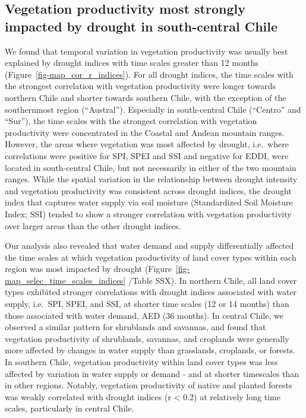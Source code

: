 \documentclass[
  sn-nature,
  numbered]{sn-jnl}
\begin{document}
\subsection{Vegetation productivity most strongly impacted by drought in
south-central
Chile}\label{vegetation-productivity-most-strongly-impacted-by-drought-in-south-central-chile}

We found that temporal variation in vegetation productivity was usually
best explained by drought indices with time scales greater than 12
months (Figure~\ref{fig-map_cor_r_indices}). For all drought indices,
the time scales with the strongest correlation with vegetation
productivity were longer towards northern Chile and shorter towards
southern Chile, with the exception of the southernmost region
(``Austral''). Especially in south-central Chile (``Centro'' and
``Sur''), the time scales with the strongest correlation with vegetation
productivity were concentrated in the Coastal and Andean mountain
ranges. However, the areas where vegetation was most affected by
drought, i.e.~where correlations were positive for SPI, SPEI and SSI and
negative for EDDI, were located in south-central Chile, but not
necessarily in either of the two mountain ranges. While the spatial
variation in the relationship between drought intensity and vegetation
productivity was consistent across drought indices, the drought index
that captures water supply via soil moisture (Standardized Soil Moisture
Index; SSI) tended to show a stronger correlation with vegetation
productivity over larger areas than the other drought indices.

Our analysis also revealed that water demand and supply differentially
affected the time scales at which vegetation productivity of land cover
types within each region was most impacted by drought
(Figure~\ref{fig-map_selec_time_scales_indices} /Table SSX). In northern
Chile, all land cover types exhibited stronger correlations with drought
indices associated with water supply, i.e.~SPI, SPEI, and SSI, at
shorter time scales (12 or 14 months) than those associated with water
demand, AED (36 months). In central Chile, we observed a similar pattern
for shrublands and savannas, and found that vegetation productivity of
shrublands, savannas, and croplands were generally more affected by
changes in water supply than grasslands, croplands, or forests. In
southern Chile, vegetation productivity within land cover types was less
affected by variation in water supply or demand - and at shorter
timescales than in other regions. Notably, vegetation productivity of
native and planted forests was weakly correlated with drought indices (r
\textless{} 0.2) at relatively long time scales, particularly in central
Chile.
\end{document}
